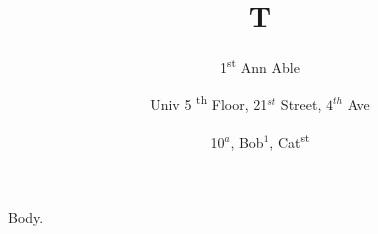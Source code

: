 \documentclass{article}
\begin{document}
\title{T}
\author{1\textsuperscript{st} Ann Able
\and Univ 5 \textsuperscript{th} Floor, 21$^{st}$ Street, $4^{th}$ Ave
\and 10$^{a}$, Bob$^{1}$, Cat\textsuperscript{st}}
\maketitle
Body.
\end{document}
